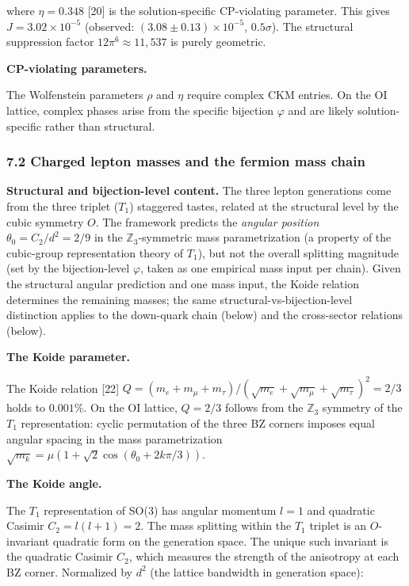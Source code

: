\documentclass[
]{article}
\begin{document}
where \(\eta = 0.348\) {[}20{]} is the solution-specific CP-violating
parameter. This gives \(J = 3.02 \times 10^{-5}\) (observed:
\((3.08 \pm 0.13) \times 10^{-5}\), \(0.5\sigma\)). The structural
suppression factor \(12\pi^6 \approx 11{,}537\) is purely geometric.

\textbf{CP-violating parameters.}

The Wolfenstein parameters \(\rho\) and \(\eta\) require complex CKM
entries. On the OI lattice, complex phases arise from the specific
bijection \(\varphi\) and are likely solution-specific rather than
structural.

\hypertarget{charged-lepton-masses-and-the-fermion-mass-chain}{%
\subsubsection{7.2 Charged lepton masses and the fermion mass
chain}\label{charged-lepton-masses-and-the-fermion-mass-chain}}

\textbf{Structural and bijection-level content.} The three lepton
generations come from the three triplet (\(T_1\)) staggered tastes,
related at the structural level by the cubic symmetry \(O\). The
framework predicts the \emph{angular position}
\(\theta_0 = C_2/d^2 = 2/9\) in the \(\mathbb{Z}_3\)-symmetric mass
parametrization (a property of the cubic-group representation theory of
\(T_1\)), but not the overall splitting magnitude (set by the
bijection-level \(\varphi\), taken as one empirical mass input per
chain). Given the structural angular prediction and one mass input, the
Koide relation determines the remaining masses; the same
structural-vs-bijection-level distinction applies to the down-quark
chain (below) and the cross-sector relations (below).

\textbf{The Koide parameter.}

The Koide relation {[}22{]}
\(Q = (m_e + m_\mu + m_\tau)/(\sqrt{m_e} + \sqrt{m_\mu} + \sqrt{m_\tau})^2 = 2/3\)
holds to \(0.001\%\). On the OI lattice, \(Q = 2/3\) follows from the
\(\mathbb{Z}_3\) symmetry of the \(T_1\) representation: cyclic
permutation of the three BZ corners imposes equal angular spacing in the
mass parametrization
\(\sqrt{m_k} = \mu(1 + \sqrt{2}\cos(\theta_0 + 2k\pi/3))\).

\textbf{The Koide angle.}

The \(T_1\) representation of SO(3) has angular momentum \(l = 1\) and
quadratic Casimir \(C_2 = l(l+1) = 2\). The mass splitting within the
\(T_1\) triplet is an \(O\)-invariant quadratic form on the generation
space. The unique such invariant is the quadratic Casimir \(C_2\), which
measures the strength of the anisotropy at each BZ corner. Normalized by
\(d^2\) (the lattice bandwidth in generation space):
\end{document}
